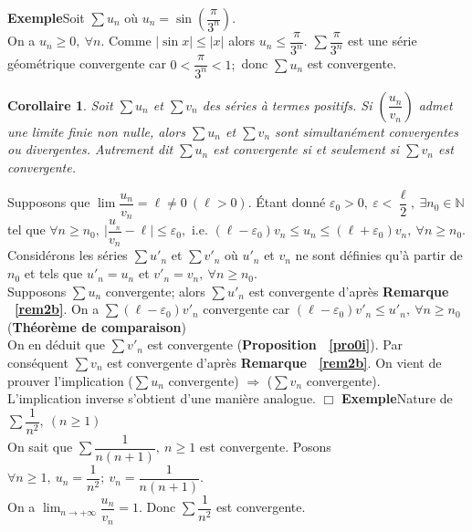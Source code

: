 \documentclass[11pt, a4paper]{book}
\newtheorem{cor}{Corollaire}[section]
\newenvironment{pr}{\noindent {\bf Preuve} \noindent} {\hfill $\Box$\vskip 5mm}
\begin{document}
\textbf{Exemple}\quad Soit $\sum u_{n}$ o\`u $u_{n}=\sin\left(\dfrac{\pi}{3^{n}}\right).$ \\ On a $u_{n}\geq0,~\forall n.$ Comme $|\sin x|\leq |x|$ alors $u_{n}\leq \dfrac{\pi}{3^{n}}.$ $\sum \dfrac{\pi}{3^{n}}$ est une s\'erie g\'eom\'etrique convergente car $0<\dfrac{\pi}{3^{n}}< 1;$ donc $\sum u_{n}$ est convergente.

\begin{cor} \label{cor1.4.1} Soit $\sum u_{n}$ et $\sum v_{n}$ des s\'eries \`a termes positifs. Si $\left(\dfrac{u_{n}}{v_{n}}\right)$ admet une limite finie non nulle, alors $\sum u_{n}$ et $\sum v_{n}$ sont simultan\'ement convergentes ou divergentes. Autrement dit $\sum u_{n}$ est convergente si et seulement si $\sum v_{n}$ est convergente. \end{cor}
\begin{pr}\quad
 Supposons que $\lim \dfrac{u_{n}}{v_{n}}=\ell\neq 0 ~(\ell>0).$ 
\'Etant donn\'e $ \varepsilon_{0}>0,~\varepsilon< \dfrac{\ell}{2},~\exists n_{0}\in \mathbb{N}$ tel que $ \forall n \geq n_{0},~\Big|\dfrac{u_{_{n}}}{v_{n}}-\ell\Big|\leq \varepsilon_{0},$ 
i.e. $(\ell-\varepsilon_{0})v_{n}\leq u_{n}\leq (\ell+\varepsilon_{0})v_{n},~ \forall n\geq n_{0}.$\\
 Consid\'erons les s\'eries $\sum u'_{n}$ et $\sum v'_{n}$ o\`u $u'_{n}$ et $v_{n}$ ne sont d\'efinies qu'\`a partir de $n_{0}$ et tels que $u'_{n}=u_{n}$ et $v'_{n}=v_{n}, ~\forall n\geq n_{0}. $ \\ Supposons $\sum u_{n}$ convergente; alors $\sum u'_{n}$ est convergente d'apr\`es \textbf{Remarque ~\ref{rem2b}}. On a $\sum (\ell-\varepsilon_{0})v'_{n}$ convergente car $(\ell-\varepsilon_{0})v'_{n}\leq u'_{n},~ \forall n \geq n_{0}$ (\textbf{Th\'eor\`eme de comparaison})\\
 On en d\'eduit que $\sum v'_{n}$ est convergente (\textbf{Proposition ~\ref{pro0i}}). Par cons\'equent $\sum v_{n}$ est convergente d'apr\`es \textbf{Remarque ~\ref{rem2b}}.
On vient de prouver l'implication ($\sum u_{n} $ convergente) $\Rightarrow$ ($\sum v_{n}$ convergente). \\
L'implication inverse s'obtient d'une mani\`ere analogue.
\end{pr}
\textbf{Exemple}\quad  Nature de $\sum\dfrac{1}{n^{2}} ,~ (n \geq1)$\\
On sait que $\sum \dfrac{1}{n(n+1)},~n\geq 1$ est convergente. Posons $ \forall n \geq 1,~u_{n}=\dfrac{1}{n^{2}};~ v_{n}=\dfrac{1}{n(n+1)}.$\\On a ${\displaystyle\lim_{n \rightarrow +\infty }\dfrac{u_{n}}{v_{n}}=1}.$ Donc $\sum \dfrac{1}{n^{2}}$ est convergente.
\end{document}
